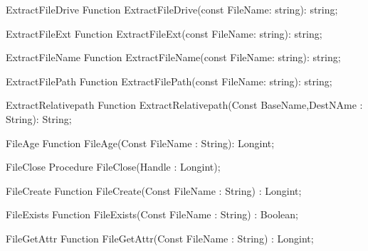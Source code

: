  
\begin{function}{ExtractFileDrive}
\Declaration
Function ExtractFileDrive(const FileName: string): string;
\Description
\Errors
\SeeAlso
\end{function}

 
\begin{function}{ExtractFileExt}
\Declaration
Function ExtractFileExt(const FileName: string): string; 
\Description
\Errors
\SeeAlso
\end{function}

 
\begin{function}{ExtractFileName}
\Declaration
Function ExtractFileName(const FileName: string): string;
\Description
\Errors
\SeeAlso
\end{function}

 
\begin{function}{ExtractFilePath}
\Declaration
Function ExtractFilePath(const FileName: string): string;
\Description
\Errors
\SeeAlso
\end{function}

 
\begin{function}{ExtractRelativepath}
\Declaration
Function ExtractRelativepath(Const BaseName,DestNAme : String): String;
\Description
\Errors
\SeeAlso
\end{function}

 
\begin{function}{FileAge}
\Declaration
Function FileAge(Const FileName : String): Longint;
\Description
\Errors
\SeeAlso
\end{function}

 
\begin{procedure}{FileClose}
\Declaration
Procedure FileClose(Handle : Longint);
\Description
\Errors
\SeeAlso
\end{procedure}

 
\begin{function}{FileCreate}
\Declaration
Function FileCreate(Const FileName : String) : Longint;
\Description
\Errors
\SeeAlso
\end{function}

 
\begin{function}{FileExists}
\Declaration
Function FileExists(Const FileName : String) : Boolean;
\Description
\Errors
\SeeAlso
\end{function}

 
\begin{function}{FileGetAttr}
\Declaration
Function FileGetAttr(Const FileName : String) : Longint;
\Description
\Errors
\SeeAlso
\end{function}

